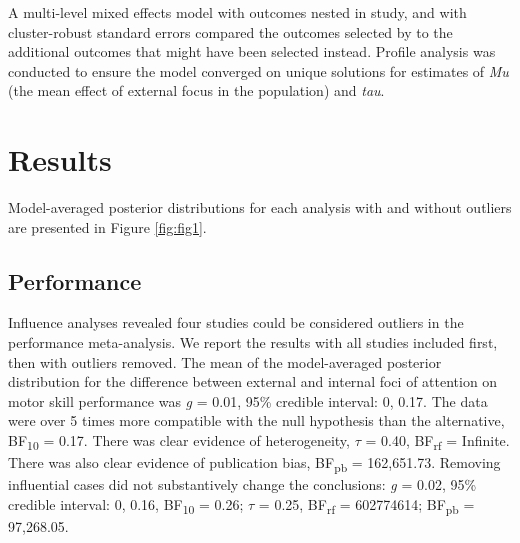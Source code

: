 \documentclass[man,floatsintext,letterpaper,12pt]{apa7}
\begin{document}
A multi-level mixed effects model with outcomes nested in study, and with cluster-robust standard errors compared the outcomes selected by \textcite{chua2021} to the additional outcomes that might have been selected instead. Profile analysis was conducted to ensure the model converged on unique solutions for estimates of \emph{Mu} (the mean effect of external focus in the population) and \emph{tau}.

\section{Results}

Model-averaged posterior distributions for each analysis with and without outliers are presented in Figure \ref{fig:fig1}.\footnotemark{}

\subsection{Performance}

Influence analyses revealed four studies \autocites[][]{marchant2009b-meta,nadzalan2015-meta,porter2010-meta}[][Experiments 1 and 2]{sherwood2014-meta} could be considered outliers in the performance meta-analysis. We report the results with all studies included first, then with outliers removed. The mean of the model-averaged posterior distribution for the difference between external and internal foci of attention on motor skill performance was \emph{g} = 0.01, 95\% credible interval: 0, 0.17. The data were over 5 times more compatible with the null hypothesis than the alternative, BF\textsubscript{10} = 0.17. There was clear evidence of heterogeneity, $\tau$ = 0.40, BF\textsubscript{rf} = Infinite. There was also clear evidence of publication bias, BF\textsubscript{pb} = 162,651.73. Removing influential cases did not substantively change the conclusions: \emph{g} = 0.02, 95\% credible interval: 0, 0.16, BF\textsubscript{10} = 0.26; $\tau$ = 0.25, BF\textsubscript{rf} = 602774614; BF\textsubscript{pb} = 97,268.05.

\clearpage
\end{document}
